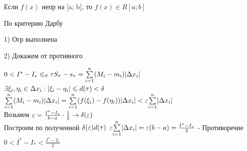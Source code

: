 \begin{theorem}[Теор2]
    Если $f(x)$ непр на [a; b], то $f(x) \in R[a; b]$\\   
\end{theorem}

\begin{Proof}
    По критерию Дарбу

    1) Огр выполнена

    2) Докажем от противного

    $0 < I^* - I_* \leq_\forall\tau S_\tau - s_\tau = \Sum{i = 1}{n}(M_i - m_i)|\D x_i|$\\
    $\exists \xi_i, \eta_i \in \D x_i: |\xi_i - \eta_i| \leq d(\tau)< \delta$\\
    $\Sum{i = 1}{n}(M_i - m_i)|\D x_i| = \Sum{i = 1}{n}(f(\xi_i) - f(\eta_i))|\D x_i| < \eps \Sum{i = 1}{n}|\D x_i|$\\
    Возьмем $\eps = \frac{I^* - I_*}{b - a} \cdot \frac{1}{2} \rightarrow \delta(\eps)$\\
    Построим по полученной $\delta(\eps) d(\tau)$
    $\eps \Sum{i = 1}{n}|\D x_i| = \eps(b - a) = \frac{I^* - I_*}{2}$ - Противоречие\\
    $0 < I^* - I_* < \frac{I^* - I_*}{2}$
\end{Proof}



